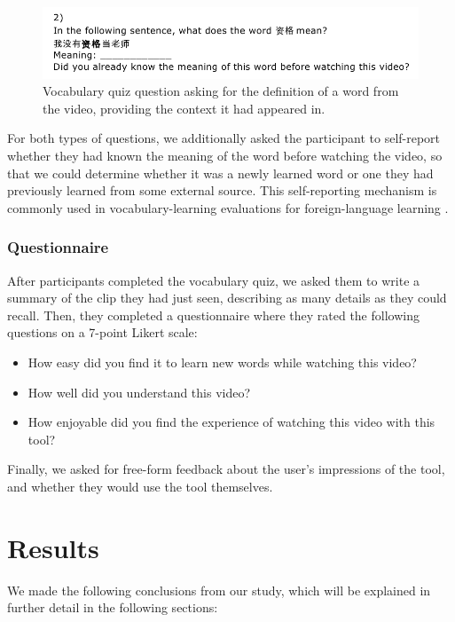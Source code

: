 \documentclass{sigchi}
\begin{document}
\begin{figure}[!h]
\centering
\includegraphics[width=\columnwidth]{vocab-quiz-2}
\caption{Vocabulary quiz question asking for the definition
of a word from the video, providing the context it had appeared in.}
\label{fig:figure5}
\end{figure}

For both types of questions, we additionally asked the participant to self-report whether they had known the meaning of the word before watching the video, so that we could determine whether it was a newly learned word or one they had previously learned from some external source. This self-reporting mechanism is commonly used in vocabulary-learning evaluations for foreign-language learning \cite{wesche1996assessing}.

\subsubsection{Questionnaire}

After participants completed the vocabulary quiz, we asked them to write a summary of the clip they had
just seen, describing as many details as they could recall. Then, they completed
a questionnaire where they rated the following questions on a 7-point Likert scale:

\begin{itemize}[noitemsep]
\item How easy did you find it to learn new words while watching this video?
\item How well did you understand this video?
\item How enjoyable did you find the experience of watching this video with this tool?
\end{itemize}

Finally, we asked for free-form feedback about the user's impressions of the tool, and whether they would use the tool themselves.

\section{Results}

We made the following conclusions from our study, which will be explained in
further detail in the following sections:
\end{document}
